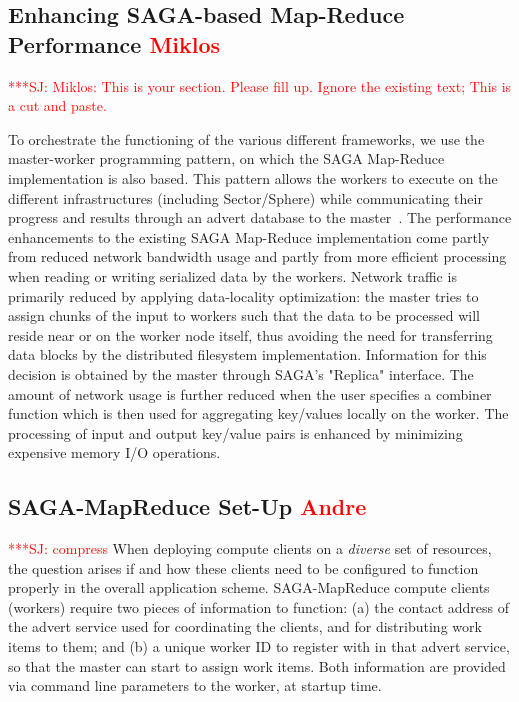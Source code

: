 \documentclass[3p,twocolumn]{elsarticle}
\newcommand{\jhanote}[1]{ {\textcolor{red} { ***SJ: #1 }}}
\newcommand{\jhanote}[1]{}
\newcommand{\sagamapreduce }{SAGA-MapReduce }
\newcommand{\I}[1]{\textit{#1}}
\begin{document}
\subsection{Enhancing SAGA-based Map-Reduce Performance \textcolor{red}{Miklos}}

\jhanote{Miklos: This is your section. Please fill up. Ignore the
  existing text; This is a cut and paste. }

To orchestrate the functioning of the various different frameworks, we
use the master-worker programming pattern, on which the SAGA
Map-Reduce implementation is also based. This pattern allows the
workers to execute on the different infrastructures (including
Sector/Sphere) while communicating their progress and results through
an advert database to the master~\cite{saga_ccgrid09}. The performance
enhancements to the existing SAGA Map-Reduce implementation come
partly from reduced network bandwidth usage and partly from more
efficient processing when reading or writing serialized data by the
workers. Network traffic is primarily reduced by applying
data-locality optimization: the master tries to assign chunks of the
input to workers such that the data to be processed will reside near
or on the worker node itself, thus avoiding the need for transferring
data blocks by the distributed filesystem implementation. Information
for this decision is obtained by the master through SAGA's "Replica"
interface. The amount of network usage is further reduced when the
user specifies a combiner function which is then used for aggregating
key/values locally on the worker. The processing of input and output
key/value pairs is enhanced by minimizing expensive memory I/O
operations.

\subsection{\sagamapreduce Set-Up \textcolor{red}{Andre}}

\jhanote{compress}
When deploying compute clients on a \I{diverse} set of resources, the
question arises if and how these clients need to be configured to
function properly in the overall application scheme.  \sagamapreduce
compute clients (workers) require two pieces of information to
function: (a) the contact address of the advert service used for
coordinating the clients, and for distributing work items to them; and
(b) a unique worker ID to register with in that advert service, so
that the master can start to assign work items.  Both information are
provided via command line parameters to the worker, at startup time.
\end{document}
